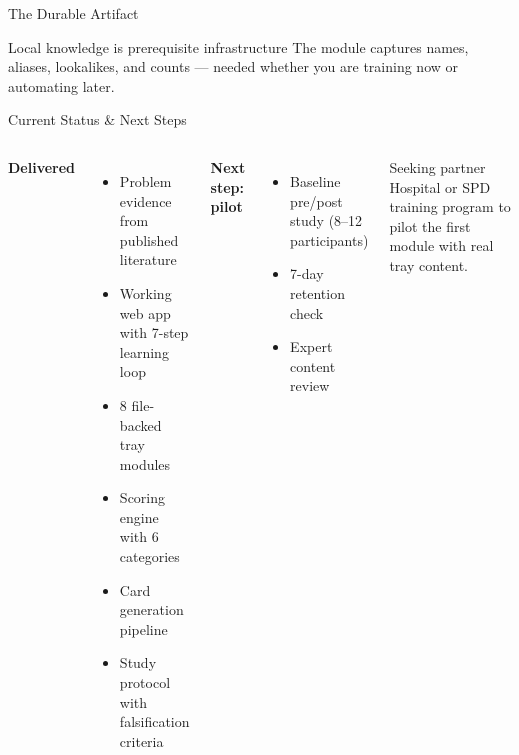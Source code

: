 \documentclass[10pt,aspectratio=169]{beamer}
\begin{document}
\begin{frame}{The Durable Artifact}
  \centering
  \vspace{0.3cm}
  \vspace{0.5cm}
  \begin{block}{Local knowledge is prerequisite infrastructure}
    The module captures names, aliases, lookalikes, and counts ---
    needed whether you are training now or automating later.
  \end{block}
\end{frame}

\begin{frame}{Current Status \& Next Steps}
  \begin{columns}[T]
    \textbf{Delivered}
    \begin{itemize}
      \item Problem evidence from published literature
      \item Working web app with 7-step learning loop
      \item 8 file-backed tray modules
      \item Scoring engine with 6 categories
      \item Card generation pipeline
      \item Study protocol with falsification criteria
    \end{itemize}
    \textbf{Next step: pilot}
    \begin{itemize}
      \item Baseline pre/post study (8--12 participants)
      \item 7-day retention check
      \item Expert content review
    \end{itemize}
    \vspace{0.3cm}
    \begin{exampleblock}{Seeking partner}
      Hospital or SPD training program to pilot the first module
      with real tray content.
    \end{exampleblock}
  \end{columns}
\end{frame}
\end{document}
